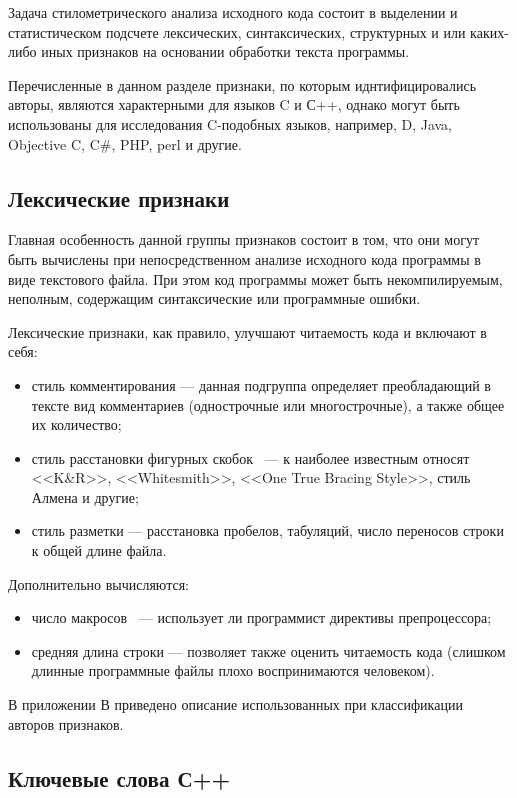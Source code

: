 Задача стилометрического анализа исходного кода состоит в выделении и статистическом подсчете 
лексических, синтаксических, структурных и или каких-либо иных признаков на основании
обработки текста программы.

Перечисленные в данном разделе признаки, по которым иднтифицировались авторы, являются характерными для языков C и С++, однако могут быть 
использованы для исследования C-подобных языков, например, D, Java, Objective C, C\#, PHP, perl и другие.

\subsection{Лексические признаки}

Главная особенность данной группы признаков состоит в том, что они могут быть вычислены при 
непосредственном анализе исходного кода программы в виде текстового файла. 
При этом код программы может быть некомпилируемым, неполным, содержащим
синтаксические или программные ошибки.

Лексические признаки, как правило, улучшают читаемость кода и включают в себя:

\begin{itemize}
 \item стиль комментирования --- данная подгруппа определяет преобладающий в тексте вид комментариев 
 (однострочные или многострочные), а также общее их количество;
 \item стиль расстановки фигурных скобок~\cite{bracing_styles} --- к наиболее известным относят <<K\&R>>, <<Whitesmith>>,
 <<One True Bracing Style>>, стиль Алмена и другие; 
 \item стиль разметки --- расстановка пробелов, табуляций, число переносов строки к общей длине файла.
\end{itemize}


Дополнительно вычисляются:
\begin{itemize}
 \item число макросов~\cite{macros} --- использует ли программист директивы препроцессора;
 \item средняя длина строки --- позволяет также оценить читаемость кода (слишком длинные программные файлы
 плохо воспринимаются человеком).
\end{itemize}


В приложении В приведено описание использованных при классификации авторов 
признаков.

\subsection{Ключевые слова С++}\label{keycpp}
